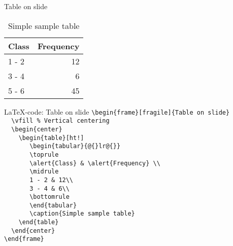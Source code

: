 \begin{frame}[fragile]{Table on slide}
\vfill %
\begin{center}
\begin{table}[ht!]
\begin{tabular}{@{}lr@{}}
\toprule
\alert{Class} & \alert{Frequency} \\ 
\midrule
1 - 2 & 12\\
3 - 4 & 6\\
5 - 6 & 45\\
\bottomrule
\end{tabular}
\caption{Simple sample table}
\end{table}
\end{center}
\end{frame}

\toggleslidecolors
\begin{frame}[fragile]{\LaTeX-code: Table on slide}
\footnotesize
\verb|\begin{frame}[fragile]{Table on slide}|\\
\verb|  \vfill % Vertical centering|\\
\verb|  \begin{center}|\\
\verb|    \begin{table}[ht!]|\\
\verb|       \begin{tabular}{@{}lr@{}}|\\
\verb|       \toprule|\\
\verb|       \alert{Class} & \alert{Frequency} \\ |\\
\verb|       \midrule|\\
\verb|       1 - 2 & 12\\|\\
\verb|       3 - 4 & 6\\|\\
\verb|       \bottomrule|\\
\verb|       \end{tabular}|\\
\verb|       \caption{Simple sample table}|\\
\verb|    \end{table}|\\
\verb|  \end{center}|\\
\verb|\end{frame}|\\
\end{frame}
\toggleslidecolors


